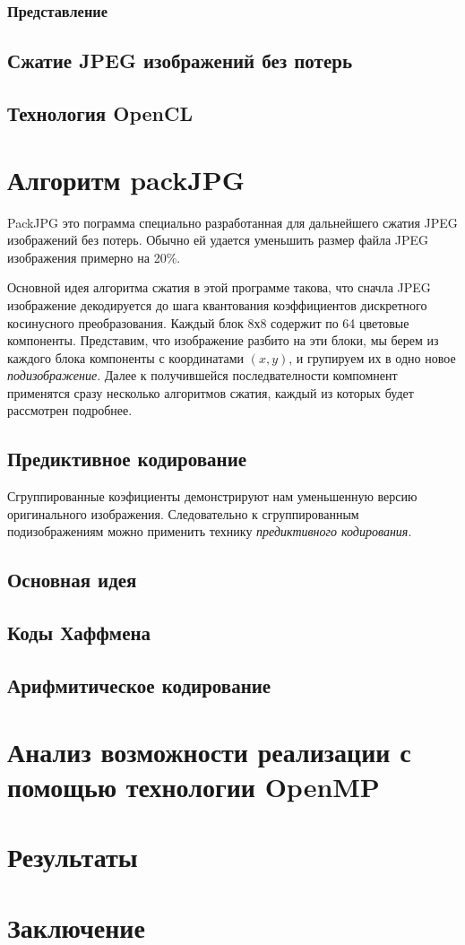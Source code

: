 \documentclass{matmex-diploma-custom}
\begin{document}
\subsubsection{Представление}
\subsection{Сжатие JPEG изображений без потерь}
\subsection{Технология OpenCL}
\section{Алгоритм packJPG}

PackJPG это пограмма специально разработанная для дальнейшего сжатия JPEG изображений без потерь. Обычно ей удается уменьшить размер файла JPEG изображения  примерно на 20\%.

Основной идея алгоритма сжатия в этой программе такова, что сначла JPEG изображение декодируется до шага квантования коэффициентов дискретного косинусного преобразования. Каждый блок 8х8 содержит по 64 цветовые компоненты. Представим, что изображение разбито на эти блоки, мы берем из каждого блока компоненты с координатами $(x,y)$, и групируем их в одно новое \emph{подизображение}. Далее к получившейся последвателности компомнент применятся сразу несколько алгоритмов сжатия, каждый из которых будет рассмотрен подробнее.

  \subsection{Предиктивное кодирование}
  Сгруппированные коэфициенты демонстрируют нам уменьшенную версию оригинального изображения. Следовательно к сгруппированным подизображениям можно применить технику \emph{предиктивного кодирования}.


\subsection{Основная идея}
\subsection{Коды Хаффмена}
\subsection{Арифмитическое кодирование}
\section{Анализ возможности реализации с помощью технологии OpenMP}
\section{Результаты}

\section*{Заключение}



\end{document}

